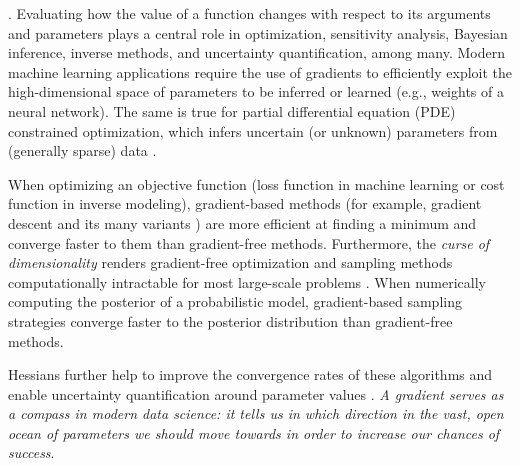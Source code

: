 .
% 
Evaluating how the value of a function changes with respect to its arguments and parameters plays a central role in optimization, sensitivity analysis, Bayesian inference, inverse methods, and uncertainty quantification, among many\cite{Razavi.2021}. 
Modern machine learning applications require the use of gradients to efficiently exploit  the high-dimensional space of parameters to be inferred or learned (e.g., weights of a neural network). 
The same is true for partial differential equation (PDE) constrained optimization, which infers uncertain (or unknown) parameters from (generally sparse) data  \cite{Ghattas.2021}.

When optimizing an objective function (loss function in machine learning or cost function in inverse modeling), gradient-based methods (for example, gradient descent and its many variants \cite{ruder2016overview-gradient-descent}) are more efficient at finding a minimum and converge faster to them than gradient-free methods.
Furthermore, the \textit{curse of dimensionality} renders gradient-free optimization and sampling methods computationally intractable for most large-scale problems \cite{Oden:2010tv}.
When numerically computing the posterior of a probabilistic model, gradient-based sampling strategies converge faster to the posterior distribution than gradient-free methods. 

Hessians further help to improve the convergence rates of these algorithms and enable uncertainty quantification around parameter values \cite{BuiThanh:2012ul}.
\textit{A gradient serves as a compass in modern data science: it tells us in which direction in the vast, open ocean of parameters we should move towards in order to increase our chances of success}.  

